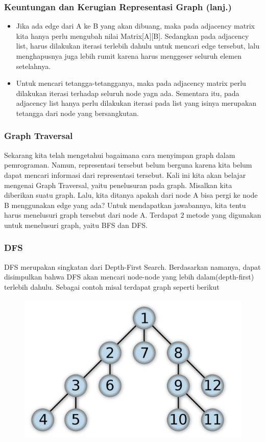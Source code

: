 \begin{frame}
\frametitle{Keuntungan dan Kerugian Representasi Graph (lanj.)}
\begin{itemize}
	\item Jika ada edge dari A ke B yang akan dibuang, maka pada adjacency matrix kita hanya perlu mengubah nilai Matrix[A][B]. Sedangkan pada adjacency list, harus dilakukan iterasi terlebih dahulu untuk mencari edge tersebut, lalu menghapusnya juga lebih rumit karena harus menggeser seluruh elemen setelahnya.
	\item Untuk mencari tetangga-tetangganya, maka pada adjacency matrix perlu dilakukan iterasi terhadap seluruh node yagn ada. Sementara itu, pada adjacency list hanya perlu dilakukan iterasi pada list yang isinya merupakan tetangga dari node yang bersangkutan.
\end{itemize}
\end{frame}

\begin{frame}
\frametitle{Graph Traversal}

Sekarang kita telah mengetahui bagaimana cara menyimpan graph dalam pemrograman. Namun, representasi tersebut belum berguna karena kita belum dapat mencari informasi dari representasi tersebut.\newline\newline
Kali ini kita akan belajar mengenai \alert{Graph Traversal}, yaitu penelusuran pada graph. Misalkan kita diberikan suatu graph. Lalu, kita ditanya apakah dari node A bisa pergi ke node B menggunakan edge yang ada? Untuk mendapatkan jawabannya, kita tentu harus menelusuri graph tersebut dari node A.\newline\newline
Terdapat 2 metode yang digunakan untuk menelusuri graph, yaitu BFS dan DFS.
\end{frame}

\begin{frame}
\frametitle{DFS}

\alert{DFS} merupakan singkatan dari Depth-First Search. Berdasarkan namanya, dapat disimpulkan bahwa DFS akan mencari node-node yang lebih dalam(depth-first) terlebih dahulu. Sebagai contoh misal terdapat graph seperti berikut

\begin{figure}
	\centering
	\includegraphics[width=6 cm]{asset/dfs.png}
\end{figure}
\end{frame}

